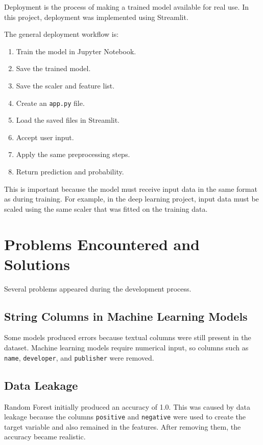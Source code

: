\documentclass[12pt,a4paper]{article}
\begin{document}
Deployment is the process of making a trained model available for real use. In this project, deployment was implemented using Streamlit.

The general deployment workflow is:

\begin{enumerate}
    \item Train the model in Jupyter Notebook.
    \item Save the trained model.
    \item Save the scaler and feature list.
    \item Create an \texttt{app.py} file.
    \item Load the saved files in Streamlit.
    \item Accept user input.
    \item Apply the same preprocessing steps.
    \item Return prediction and probability.
\end{enumerate}

This is important because the model must receive input data in the same format as during training. For example, in the deep learning project, input data must be scaled using the same scaler that was fitted on the training data.

\section{Problems Encountered and Solutions}

Several problems appeared during the development process.

\subsection{String Columns in Machine Learning Models}

Some models produced errors because textual columns were still present in the dataset. Machine learning models require numerical input, so columns such as \texttt{name}, \texttt{developer}, and \texttt{publisher} were removed.

\subsection{Data Leakage}

Random Forest initially produced an accuracy of 1.0. This was caused by data leakage because the columns \texttt{positive} and \texttt{negative} were used to create the target variable and also remained in the features. After removing them, the accuracy became realistic.
\end{document}
